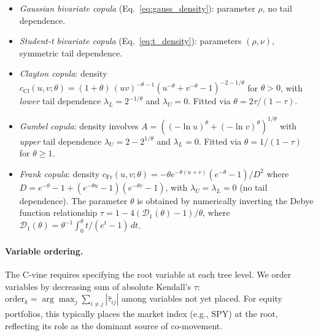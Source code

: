 \begin{itemize}
    \item \textit{Gaussian bivariate copula} (Eq.~\ref{eq:gauss_density}): parameter $\rho$, no tail dependence.
    \item \textit{Student-t bivariate copula} (Eq.~\ref{eq:t_density}): parameters $(\rho, \nu)$, symmetric tail dependence.
    \item \textit{Clayton copula}: density $c_{\text{Cl}}(u,v;\theta) = (1{+}\theta)\,(uv)^{-\theta-1}(u^{-\theta}{+}v^{-\theta}{-}1)^{-2-1/\theta}$ for $\theta > 0$, with \emph{lower} tail dependence $\lambda_L = 2^{-1/\theta}$ and $\lambda_U = 0$. Fitted via $\theta = 2\tau/(1{-}\tau)$.
    \item \textit{Gumbel copula}: density involves $A = ((-\ln u)^\theta{+}(-\ln v)^\theta)^{1/\theta}$ with \emph{upper} tail dependence $\lambda_U = 2 - 2^{1/\theta}$ and $\lambda_L = 0$. Fitted via $\theta = 1/(1{-}\tau)$ for $\theta \geq 1$.
    \item \textit{Frank copula}: density $c_{\text{Fr}}(u,v;\theta) = -\theta e^{-\theta(u+v)}(e^{-\theta}{-}1)/D^2$ where $D = e^{-\theta}{-}1+(e^{-\theta u}{-}1)(e^{-\theta v}{-}1)$, with $\lambda_U = \lambda_L = 0$ (no tail dependence). The parameter $\theta$ is obtained by numerically inverting the Debye function relationship $\tau = 1 - 4(\mathcal{D}_1(\theta){-}1)/\theta$, where $\mathcal{D}_1(\theta) = \theta^{-1}\!\int_0^\theta t/(e^t{-}1)\,dt$.
\end{itemize}

\paragraph{Variable ordering.}
The C-vine requires specifying the root variable at each tree level. We order variables by decreasing sum of absolute Kendall's $\tau$: $\text{order}_k = \arg\max_j \sum_{i \neq j} |\hat{\tau}_{ij}|$ among variables not yet placed. For equity portfolios, this typically places the market index (e.g., SPY) at the root, reflecting its role as the dominant source of co-movement.

